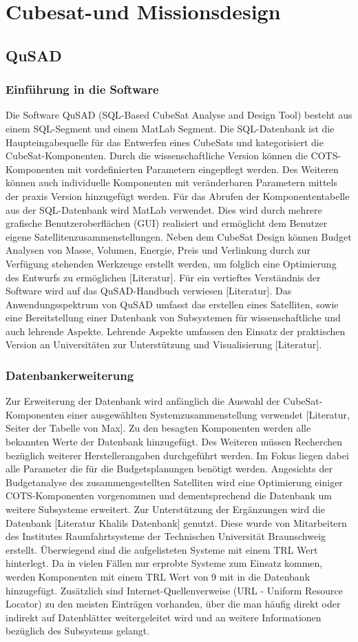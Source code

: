 \chapter{Cubesat-und Missionsdesign}
		\section{QuSAD}
			\subsection{Einführung in die Software}
Die Software QuSAD (SQL-Based CubeSat Analyse and Design Tool) besteht aus einem SQL-Segment und einem MatLab Segment. Die SQL-Datenbank ist die Haupteingabequelle für das Entwerfen eines CubeSats und kategorisiert die CubeSat-Komponenten. Durch die wissenschaftliche Version können die COTS-Komponenten mit vordefinierten Parametern eingepflegt werden. Des Weiteren können auch individuelle Komponenten mit veränderbaren Parametern mittels der praxis Version hinzugefügt werden. Für das Abrufen der Komponententabelle aus der SQL-Datenbank wird MatLab verwendet. Dies wird durch mehrere grafische Benutzeroberflächen (GUI) realisiert und ermöglicht dem Benutzer eigene Satellitenzusammenstellungen. Neben dem CubeSat Design können Budget Analysen von Masse, Volumen, Energie, Preis und Verlinkung durch zur Verfügung stehenden Werkzeuge erstellt werden, um folglich eine Optimierung des Entwurfs zu ermöglichen [Literatur]. Für ein vertieftes Verständnis der Software wird auf das QuSAD-Handbuch verwiesen [Literatur]. Das Anwendungsspektrum von QuSAD umfasst das erstellen eines Satelliten, sowie eine Bereitstellung einer Datenbank von Subsystemen für wissenschaftliche und auch lehrende Aspekte. Lehrende Aspekte umfassen den Einsatz der praktischen Version an Universitäten zur Unterstützung und Visualisierung [Literatur]. 
			\subsection{Datenbankerweiterung}
			Zur Erweiterung der Datenbank wird anfänglich die Auswahl der CubeSat-Komponenten einer ausgewählten Systemzusammenstellung verwendet [Literatur, Seiter der Tabelle von Max]. Zu den besagten Komponenten werden alle bekannten Werte der Datenbank hinzugefügt. Des Weiteren müssen Recherchen bezüglich weiterer Herstellerangaben durchgeführt werden. Im Fokus liegen dabei alle Parameter die für die Budgetsplanungen benötigt werden. Angesichts der Budgetanalyse des zusammengestellten Satelliten wird eine Optimierung einiger COTS-Komponenten vorgenommen und dementsprechend die Datenbank um weitere Subsysteme erweitert. Zur Unterstützung der Ergänzungen wird die Datenbank [Literatur Khalils Datenbank] genutzt. Diese wurde von Mitarbeitern des Institutes Raumfahrtsysteme der Technischen Universität Braunschweig erstellt. Überwiegend sind die aufgelisteten Systeme mit einem TRL Wert hinterlegt. Da in vielen Fällen nur erprobte Systeme zum Einsatz kommen, werden Komponenten mit einem TRL Wert von 9 mit in die Datenbank hinzugefügt. Zusätzlich sind Internet-Quellenverweise (URL - Uniform Resource Locator) zu den meisten Einträgen vorhanden, über die man häufig direkt oder indirekt auf Datenblätter weitergeleitet wird und an weitere Informationen bezüglich des Subsystems gelangt.

